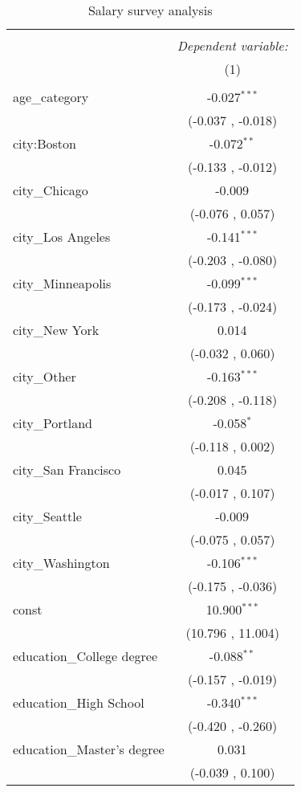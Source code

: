 \begin{table}[!htbp] \centering
  \caption{Salary survey analysis}
\begin{tabular}{@{\extracolsep{5pt}}lc}
\\[-1.8ex]\hline
\hline \\[-1.8ex]
& \multicolumn{1}{c}{\textit{Dependent variable:}} \
\cr \cline{1-2}
\\[-1.8ex] & (1) \\
\hline \\[-1.8ex]
 age_category & -0.027$^{***}$ \\
  & (-0.037 , -0.018) \\
 city:Boston & -0.072$^{**}$ \\
  & (-0.133 , -0.012) \\
 city_Chicago & -0.009$^{}$ \\
  & (-0.076 , 0.057) \\
 city_Los Angeles & -0.141$^{***}$ \\
  & (-0.203 , -0.080) \\
 city_Minneapolis & -0.099$^{***}$ \\
  & (-0.173 , -0.024) \\
 city_New York & 0.014$^{}$ \\
  & (-0.032 , 0.060) \\
 city_Other & -0.163$^{***}$ \\
  & (-0.208 , -0.118) \\
 city_Portland & -0.058$^{*}$ \\
  & (-0.118 , 0.002) \\
 city_San Francisco & 0.045$^{}$ \\
  & (-0.017 , 0.107) \\
 city_Seattle & -0.009$^{}$ \\
  & (-0.075 , 0.057) \\
 city_Washington & -0.106$^{***}$ \\
  & (-0.175 , -0.036) \\
 const & 10.900$^{***}$ \\
  & (10.796 , 11.004) \\
 education_College degree & -0.088$^{**}$ \\
  & (-0.157 , -0.019) \\
 education_High School & -0.340$^{***}$ \\
  & (-0.420 , -0.260) \\
 education_Master's degree & 0.031$^{}$ \\
  & (-0.039 , 0.100) \\

\end{tabular}
\end{table}

